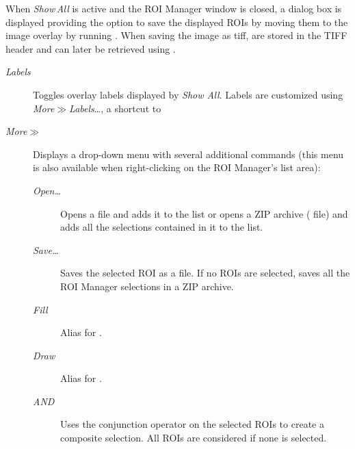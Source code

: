 \begin{minipage}[c][1\totalheight][t]{0.634\columnwidth}%
When \emph{Show\,All }is active and the ROI Manager window is closed,
a dialog box is displayed providing the option to save the displayed
ROIs by moving them to the image overlay by running .
When saving the image as tiff,  are stored
in the TIFF header and can later be retrieved using .%
\end{minipage}
\begin{description}
\item [{\emph{Labels}}] Toggles
overlay labels displayed by \emph{Show All}. Labels are customized
using \emph{More}{\scriptsize $\gg$}\emph{Labels}\ldots{}, a shortcut
to 
\item [{\emph{More}{\scriptsize $\gg$}}] \improvement{}Displays a drop-down
menu with several additional commands (this menu is also available
when right-clicking on the ROI Manager's list area):

\begin{description}
\item [{\emph{Open\ldots{}}}] Opens a  file and adds
it to the list or opens a ZIP archive (
file) and adds all the selections contained in it to the list.
\item [{\emph{Save\ldots{}}}] Saves the selected ROI as a 
file. If no ROIs are selected, saves all the ROI Manager selections
in a ZIP archive.
\item [{\emph{Fill}}] Alias for .
\item [{\emph{Draw}}] Alias for .
\item [{\emph{AND}}] Uses the conjunction operator on the selected ROIs
to create a composite selection. All ROIs are considered if none is
selected.
\end{description}
\end{description}
